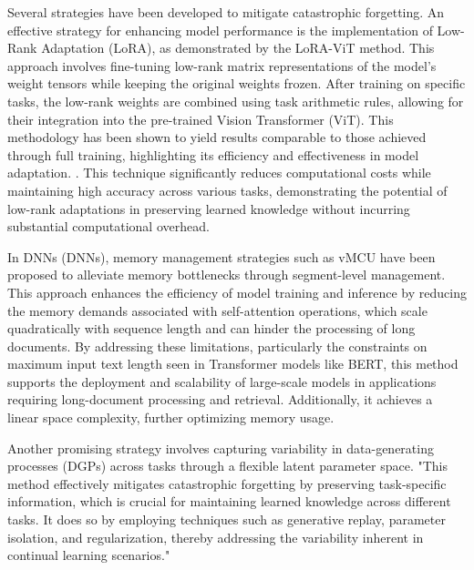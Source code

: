 Several strategies have been developed to mitigate catastrophic forgetting. An effective strategy for enhancing model performance is the implementation of Low-Rank Adaptation (LoRA), as demonstrated by the LoRA-ViT method. This approach involves fine-tuning low-rank matrix representations of the model's weight tensors while keeping the original weights frozen. After training on specific tasks, the low-rank weights are combined using task arithmetic rules, allowing for their integration into the pre-trained Vision Transformer (ViT). This methodology has been shown to yield results comparable to those achieved through full training, highlighting its efficiency and effectiveness in model adaptation. \cite{chitale2023taskarithmeticloracontinual}. This technique significantly reduces computational costs while maintaining high accuracy across various tasks, demonstrating the potential of low-rank adaptations in preserving learned knowledge without incurring substantial computational overhead.



In DNNs (DNNs), memory management strategies such as vMCU have been proposed to alleviate memory bottlenecks through segment-level management. This approach enhances the efficiency of model training and inference by reducing the memory demands associated with self-attention operations, which scale quadratically with sequence length and can hinder the processing of long documents. By addressing these limitations, particularly the constraints on maximum input text length seen in Transformer models like BERT, this method supports the deployment and scalability of large-scale models in applications requiring long-document processing and retrieval. Additionally, it achieves a linear space complexity, further optimizing memory usage. \cite{ginzburg2021selfsuperviseddocumentsimilarityranking}



Another promising strategy involves capturing variability in data-generating processes (DGPs) across tasks through a flexible latent parameter space. "This method effectively mitigates catastrophic forgetting by preserving task-specific information, which is crucial for maintaining learned knowledge across different tasks. It does so by employing techniques such as generative replay, parameter isolation, and regularization, thereby addressing the variability inherent in continual learning scenarios." \cite{goldfarb2022analysiscatastrophicforgettingrandom}



